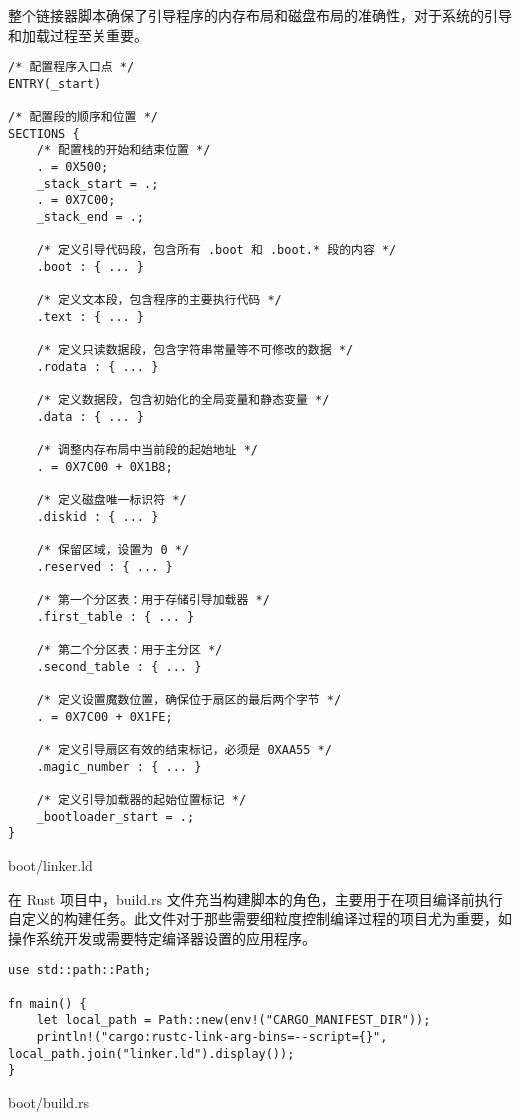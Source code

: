 整个链接器脚本确保了引导程序的内存布局和磁盘布局的准确性，对于系统的引导和加载过程至关重要。

\begin{listing}[htbp]
    \begin{verbatim}
/* 配置程序入口点 */
ENTRY(_start)

/* 配置段的顺序和位置 */
SECTIONS {
    /* 配置栈的开始和结束位置 */
    . = 0X500;
    _stack_start = .;
    . = 0X7C00;
    _stack_end = .;

    /* 定义引导代码段，包含所有 .boot 和 .boot.* 段的内容 */
    .boot : { ... }

    /* 定义文本段，包含程序的主要执行代码 */
    .text : { ... }

    /* 定义只读数据段，包含字符串常量等不可修改的数据 */
    .rodata : { ... }

    /* 定义数据段，包含初始化的全局变量和静态变量 */
    .data : { ... }

    /* 调整内存布局中当前段的起始地址 */
    . = 0X7C00 + 0X1B8;

    /* 定义磁盘唯一标识符 */
    .diskid : { ... }

    /* 保留区域，设置为 0 */
    .reserved : { ... }

    /* 第一个分区表：用于存储引导加载器 */
    .first_table : { ... }

    /* 第二个分区表：用于主分区 */
    .second_table : { ... }

    /* 定义设置魔数位置，确保位于扇区的最后两个字节 */
    . = 0X7C00 + 0X1FE;

    /* 定义引导扇区有效的结束标记，必须是 0XAA55 */
    .magic_number : { ... }

    /* 定义引导加载器的起始位置标记 */
    _bootloader_start = .;
}
    \end{verbatim}
    \caption{boot/linker.ld}\label{lst:BootLinkerScript}
\end{listing}

在 Rust 项目中，build.rs 文件充当构建脚本的角色，主要用于在项目编译前执行自定义的构建任务。此文件对于那些需要细粒度控制编译过程的项目尤为重要，如操作系统开发或需要特定编译器设置的应用程序。

\begin{listing}[htbp]
    \begin{verbatim}
use std::path::Path;

fn main() {
    let local_path = Path::new(env!("CARGO_MANIFEST_DIR"));
    println!("cargo:rustc-link-arg-bins=--script={}", local_path.join("linker.ld").display());
}
    \end{verbatim}
    \caption{boot/build.rs}\label{lst:BootBuildRust}
\end{listing}

